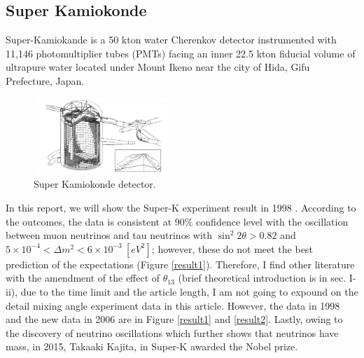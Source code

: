 \documentclass[12pt]{article}
\begin{document}
\begin{multicols}{2}
\section{Super Kamiokonde}
    Super-Kamiokande is a 50 kton water Cherenkov detector instrumented with 11,146 photomultiplier tubes (PMTs) facing an inner 22.5 kton fiducial volume of ultrapure water located under Mount Ikeno near the city of Hida, Gifu Prefecture, Japan. \cite{SKinfo}

    \begin{figure}[H]
        \centering
        \includegraphics[width = 0.45\textwidth]{../figure/dect.png}
        \caption{Super Kamiokonde detector. \cite{dect}}
        \label{dect}
    \end{figure}

    In this report, we will show the Super-K experiment result in 1998 \cite{SKinfo}. According to the outcomes, the data is consistent at $90\%$ confidence level with the oscillation between muon neutrinos and tau neutrinos with $\sin^{2} 2\theta > 0.82$ and $5 \times 10^{-4} < \Delta m^{2} < 6 \times 10^{-3}\ [eV^{2}]$; however, these do not meet the best prediction of the expectations (Figure \ref{result1}). Therefore, I find other literature with the amendment of the effect of $\theta_{13}$ (brief theoretical introduction is in sec. I-ii), due to the time limit and the article length, I am not going to 
    expound on the detail mixing angle experiment data in this article. However, the data in 1998 \cite{SKinfo} and the new data in 2006 \cite{SKexp} are in Figure \ref{result1} and \ref{result2}. Lastly, owing to the discovery of neutrino oscillations which further shows that neutrinos have mass, in 2015, Takaaki Kajita, in Super-K awarded the Nobel prize.

\end{multicols}
\end{document}
